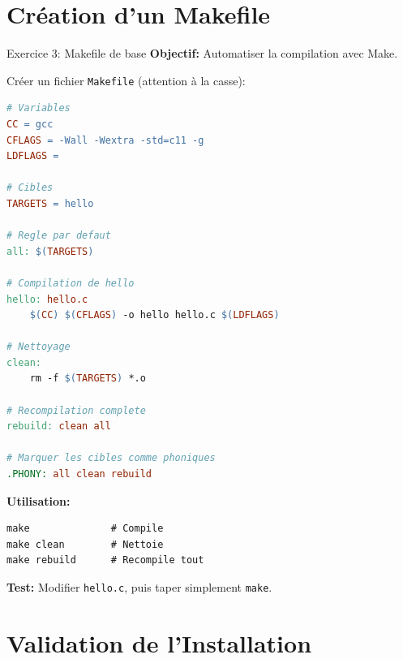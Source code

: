 \documentclass[10pt,a4paper]{article}
\begin{document}
\section{Création d'un Makefile}

\begin{exercicebox}{Exercice 3: Makefile de base}
\textbf{Objectif:} Automatiser la compilation avec Make.

Créer un fichier \texttt{Makefile} (attention à la casse):
\begin{lstlisting}[language=make]
# Variables
CC = gcc
CFLAGS = -Wall -Wextra -std=c11 -g
LDFLAGS =

# Cibles
TARGETS = hello

# Regle par defaut
all: $(TARGETS)

# Compilation de hello
hello: hello.c
	$(CC) $(CFLAGS) -o hello hello.c $(LDFLAGS)

# Nettoyage
clean:
	rm -f $(TARGETS) *.o

# Recompilation complete
rebuild: clean all

# Marquer les cibles comme phoniques
.PHONY: all clean rebuild
\end{lstlisting}

\textbf{Utilisation:}
\begin{verbatim}
make              # Compile
make clean        # Nettoie
make rebuild      # Recompile tout
\end{verbatim}

\textbf{Test:} Modifier \texttt{hello.c}, puis taper simplement \texttt{make}.
\end{exercicebox}



\section{Validation de l'Installation}
\end{document}
